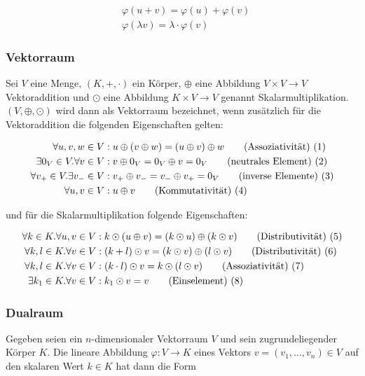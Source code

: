 \documentclass[a4paper,fontsize=12pt,toc=bib,parskip=half,ngerman]{scrartcl}
\begin{document}
\begin{align}
	&\varphi(u+v) = \varphi(u) + \varphi(v) \\
	&\varphi(\lambda v) = \lambda \cdot \varphi(v)
\end{align}

\subsubsection{Vektorraum}
Sei $V$ eine Menge, $(K, +, \cdot )$ ein K\"orper, $\oplus$ eine Abbildung $V \times V \rightarrow V$  Vektoraddition und $\odot$ eine Abbildung $K \times V \rightarrow V$ genannt Skalarmultiplikation. $(V, \oplus, \odot)$ wird dann als Vektorraum bezeichnet, wenn zus\"atzlich f\"ur die Vektoraddition die folgenden Eigenschaften gelten: 

\begin{align}
	\forall u,v,w \in V&: u \oplus (v \oplus w ) = (u \oplus v ) \oplus w 	\tag{Assoziativit\"at) (\addtocounter{equation}{1}\theequation}\\
	\exists 0_V \in V. \forall v \in V&: v\oplus 0_V = 0_V \oplus v = 0_V 	\tag{neutrales Element) (\addtocounter{equation}{1}\theequation}\\
	\forall v_+ \in V. \exists v_- \in V&: v_+ \oplus v_- = v_- \oplus v_+ = 0_V	\tag{inverse Elemente) (\addtocounter{equation}{1}\theequation}\\
	\forall u, v \in V&: u \oplus v    \tag{Kommutativit\"at) (\addtocounter{equation}{1}\theequation}
\end{align}

und f\"ur die Skalarmultiplikation folgende Eigenschaften:

\begin{align}
	\forall k \in K. \forall u,v \in V&: k \odot (u \oplus v ) = (k \odot u ) \oplus( k \odot v) 	\tag{Distributivit\"at) (\addtocounter{equation}{1}\theequation}\\
	\forall k, l \in K. \forall v \in V&: ( k + l ) \odot v = (k \odot v ) \oplus( l \odot v) 	\tag{Distributivit\"at) (\addtocounter{equation}{1}\theequation}\\
	\forall k, l \in K. \forall v \in V&: (k \cdot l) \odot v = k \odot (l \odot v)	\tag{Assoziativit\"at) (\addtocounter{equation}{1}\theequation}\\
	\exists k_1 \in K. \forall v \in V&: k_1 \odot v = v	\tag{Einselement) (\addtocounter{equation}{1}\theequation}
\end{align}

\subsubsection{Dualraum}
Gegeben seien ein $n$-dimensionaler Vektorraum  $V$ und sein zugrundeliegender K\"orper $K$. Die lineare Abbildung $\varphi: V \rightarrow K$ eines Vektors $v = (v_1, ..., v_n) \in V$ auf den skalaren Wert $k \in K$ hat dann die Form
\end{document}
